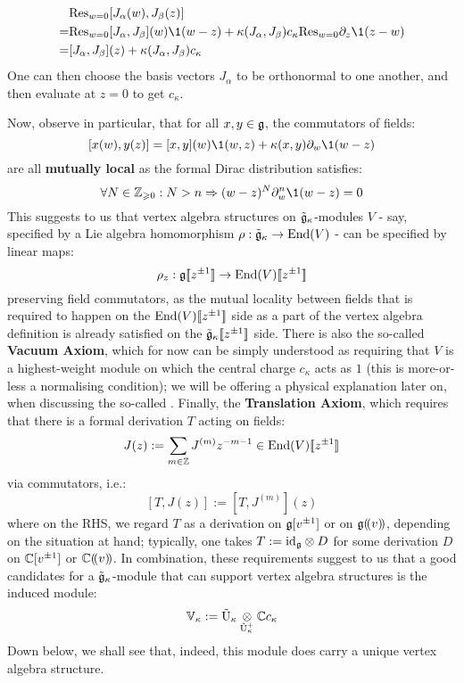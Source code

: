             $$
                \begin{aligned}
                    & \Res_{w = 0} [J_{\alpha}(w), J_{\beta}(z)]
                    \\
                    = & \Res_{w = 0} [J_{\alpha}, J_{\beta}](w) \1(w - z) + \kappa(J_{\alpha}, J_{\beta}) c_{\kappa} \Res_{w = 0} \del_z \1(z - w)
                    \\
                    = & [J_{\alpha}, J_{\beta}](z) + \kappa(J_{\alpha}, J_{\beta}) c_{\kappa} 
                \end{aligned}
            $$
        One can then choose the basis vectors $J_{\alpha}$ to be orthonormal to one another, and then evaluate at $z = 0$ to get $c_{\kappa}$. 

        Now, observe in particular, that for all $x, y \in \mathfrak{g}$, the commutators of fields:
            $$[x(w), y(z)] = [x, y](w) \1(w, z) + \kappa(x, y) \del_w \1(w - z)$$
        are all \textbf{mutually local} as the formal Dirac distribution satisfies:
            $$\forall N \in \Z_{\geq 0}: N > n \implies (w - z)^N \del_w^n \1(w - z) = 0$$
        This suggests to us that vertex algebra structures on $\tilde{\mathfrak{g}}_{\kappa}$-modules $V$ - say, specified by a Lie algebra homomorphism $\rho: \tilde{\mathfrak{g}}_{\kappa} \to \mathrm{End}(V)$ - can be specified by linear maps:
            $$\rho_z: \mathfrak{g}[\![z^{\pm 1}]\!] \to \mathrm{End}(V)[\![z^{\pm 1}]\!]$$
        preserving field commutators, as the mutual locality between fields that is required to happen on the $\mathrm{End}(V)[\![z^{\pm 1}]\!]$ side as a part of the vertex algebra definition is already satisfied on the $\tilde{\mathfrak{g}}_{\kappa}[\![z^{\pm 1}]\!]$ side. There is also the so-called \textbf{Vacuum Axiom}, which for now can be simply understood as requiring that $V$ is a highest-weight module on which the central charge $c_{\kappa}$ acts as $1$ (this is more-or-less a normalising condition); we will be offering a physical explanation later on, when discussing the so-called . Finally, the \textbf{Translation Axiom}, which requires that there is a formal derivation $T$ acting on fields:
            $$J(z) := \sum_{m \in \mathbb{Z}} J^{(m)} z^{-m - 1} \in \mathrm{End}(V)[\![z^{\pm 1}]\!]$$
        via commutators, i.e.:
            $$[T, J(z)] := [T, J^{(m)}](z)$$
        where on the RHS, we regard $T$ as a derivation on $\mathfrak{g}[v^{\pm 1}]$ or on $\mathfrak{g}(\!(v)\!)$, depending on the situation at hand; typically, one takes $T := \id_{\g} \tensor D$ for some derivation $D$ on $\mathbb{C}[v^{\pm 1}]$ or $\mathbb{C}(\!(v)\!)$. In combination, these requirements suggest to us that a good candidates for a $\tilde{\mathfrak{g}}_{\kappa}$-module that can support vertex algebra structures is the induced module:
            $$\V_{\kappa} := \tilde{\rmU}_{\kappa} \tensor_{\tilde{\rmU}_{\kappa}^+} \bbC c_{\kappa}$$
        Down below, we shall see that, indeed, this module does carry a unique vertex algebra structure.